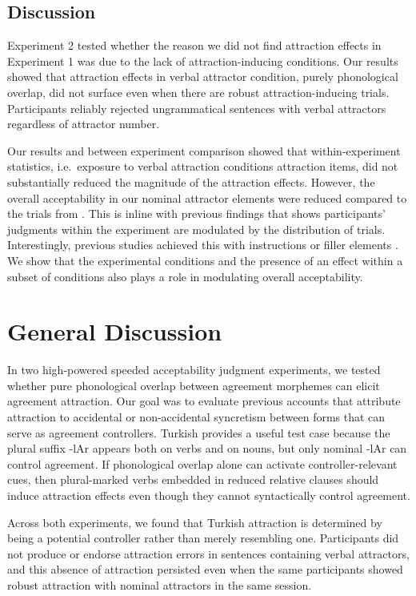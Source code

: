 \documentclass[
  authoryear,
  3p]{elsarticle}
\begin{document}
\subsection{Discussion}\label{discussion-1}

Experiment 2 tested whether the reason we did not find attraction
effects in Experiment 1 was due to the lack of attraction-inducing
conditions. Our results showed that attraction effects in verbal
attractor condition, purely phonological overlap, did not surface even
when there are robust attraction-inducing trials. Participants reliably
rejected ungrammatical sentences with verbal attractors regardless of
attractor number.

Our results and between experiment comparison showed that
within-experiment statistics, i.e.~exposure to verbal attraction
conditions attraction items, did not substantially reduced the magnitude
of the attraction effects. However, the overall acceptability in our
nominal attractor elements were reduced compared to the trials from
\citet{TurkLogacev2024}. This is inline with previous findings that
shows participants' judgments within the experiment are modulated by the
distribution of trials. Interestingly, previous studies achieved this
with instructions or filler elements
\citep{HammerlyEtAl2019, ArehalliWittenberg2021}. We show that the
experimental conditions and the presence of an effect within a subset of
conditions also plays a role in modulating overall acceptability.

\section{General Discussion}\label{general-discussion}

In two high-powered speeded acceptability judgment experiments, we
tested whether pure phonological overlap between agreement morphemes can
elicit agreement attraction. Our goal was to evaluate previous accounts
that attribute attraction to accidental or non-accidental syncretism
between forms that can serve as agreement controllers. Turkish provides
a useful test case because the plural suffix -lAr appears both on verbs
and on nouns, but only nominal -lAr can control agreement. If
phonological overlap alone can activate controller-relevant cues, then
plural-marked verbs embedded in reduced relative clauses should induce
attraction effects even though they cannot syntactically control
agreement.

Across both experiments, we found that Turkish attraction is determined
by being a potential controller rather than merely resembling one.
Participants did not produce or endorse attraction errors in sentences
containing verbal attractors, and this absence of attraction persisted
even when the same participants showed robust attraction with nominal
attractors in the same session.
\end{document}
